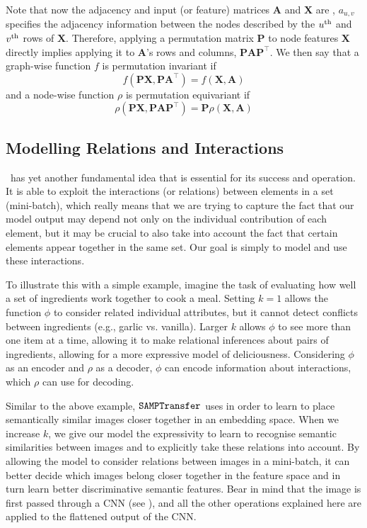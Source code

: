 Note that now the adjacency and input (or feature) matrices $\symbf{A}$ and $\symbf{X}$ are , $a_{u, v}$
specifies the adjacency information between the nodes described by the $u\textsuperscript{th}$ and $v\textsuperscript{th}$
rows of $\symbf{X}$. Therefore, applying a permutation matrix $\symbf{P}$ to node features $\symbf{X}$ directly implies applying it to $\symbf{A}$'s rows and columns, $\symbf{PA}\symbf{P}^\top$. We then say that a graph-wise function $f$ is permutation invariant if 
\begin{equation}
    f\left(\symbf{P X}, \symbf{P A}^{\top}\right)=f(\symbf{X}, \symbf{A})
\end{equation}
and a node-wise function $\rho$ is permutation equivariant if
\begin{equation}
    \rho\left(\symbf{P X}, \symbf{P A P}^{\top}\right)=\symbf{P}\rho(\symbf{X}, \symbf{A})
\end{equation}

\subsection{Modelling Relations and Interactions}\label{ssec:relation-and-interactions}

\samptr\ has yet another fundamental idea that is essential for its success and operation. 
It is able to exploit the interactions (or relations) between elements in a set (mini-batch), which really means that we are trying to capture the fact that our model output may depend not only on the individual contribution of each element, but it may be crucial to also take into account the fact that certain elements appear together in the same set. Our goal is simply to model and use these interactions.

To illustrate this with a simple example, imagine the task of evaluating how well a set of ingredients work together to cook a meal. Setting $k=1$ allows the function $\phi$ to consider related individual attributes, but it cannot detect conflicts between ingredients (e.g., garlic vs. vanilla). Larger $k$ allows $\phi$ to see more than one item at a time, allowing it to make relational inferences about pairs of ingredients, allowing for a more expressive model of deliciousness. Considering $\phi$ as an encoder and $\rho$ as a decoder, $\phi$ can encode information about interactions, which $\rho$ can use for decoding.

Similar to the above example, $\texttt{SAMPTransfer}$ uses  in order to learn to place semantically similar images closer together in an embedding space. When we increase $k$, we give our model the expressivity to learn to recognise semantic similarities between images and to explicitly take these relations into account. By allowing the model to consider relations between images in a mini-batch, it can better decide which images belong closer together in the feature space and in turn learn better discriminative semantic features. Bear in mind that the image is first passed through a CNN (see ), and all the other operations explained here are applied to the flattened output of the CNN.


